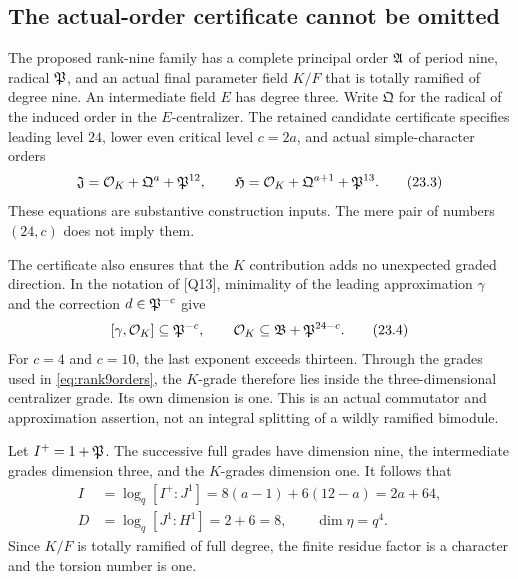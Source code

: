 
\subsection{The actual-order certificate cannot be omitted}
The proposed rank-nine family has a complete principal order $\mathfrak A$ of period nine, radical $\mathfrak P$, and an actual final parameter field $K/F$ that is totally ramified of degree nine. An intermediate field $E$ has degree three. Write $\mathfrak Q$ for the radical of the induced order in the $E$-centralizer. The retained candidate certificate specifies leading level $24$, lower even critical level $c=2a$, and actual simple-character orders
\[
 \mathfrak J=\mathcal O_K+\mathfrak Q^a+\mathfrak P^{12},
 \qquad
 \mathfrak H=\mathcal O_K+\mathfrak Q^{a+1}+\mathfrak P^{13}.
 \tag{23.3}\label{eq:rank9orders}
\]
These equations are substantive construction inputs. The mere pair of numbers $(24,c)$ does not imply them.

The certificate also ensures that the $K$ contribution adds no unexpected graded direction. In the notation of [Q13], minimality of the leading approximation $\gamma$ and the correction $d\in\mathfrak P^{-c}$ give
\[
 [\gamma,\mathcal O_K]\subseteq\mathfrak P^{-c},
 \qquad
 \mathcal O_K\subseteq\mathfrak B+\mathfrak P^{24-c}.
 \tag{23.4}\label{eq:compat}
\]
For $c=4$ and $c=10$, the last exponent exceeds thirteen. Through the grades used in \eqref{eq:rank9orders}, the $K$-grade therefore lies inside the three-dimensional centralizer grade. Its own dimension is one. This is an actual commutator and approximation assertion, not an integral splitting of a wildly ramified bimodule.

Let $I^+=1+\mathfrak P$. The successive full grades have dimension nine, the intermediate grades dimension three, and the $K$-grades dimension one. It follows that
\begin{align}
 I&=\log_q[I^+:J^1]=8(a-1)+6(12-a)=2a+64,\tag{23.4a}\label{eq:rank9I}\\
 D&=\log_q[J^1:H^1]=2+6=8,
 \qquad \dim\eta=q^4.\tag{23.4b}\label{eq:rank9D}
\end{align}
Since $K/F$ is totally ramified of full degree, the finite residue factor is a character and the torsion number is one.

